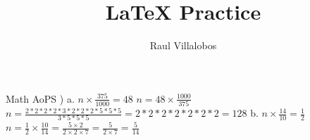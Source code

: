 \documentclass[11pt]{amsart}
\title{LaTeX Practice}
\author{Raul Villalobos}
\begin{document}
\maketitle

Math AoPS ) \newline
a. \newline
$
n\times\frac{375}{1000} = 48
$ \newline
$
n = 48 \times \frac{1000}{375}
$ \newline
$
n = \frac{2 * 2 * 2 * 2 * 3 * 2 * 2 * 2 * 5 * 5 * 5}
{3 * 5 * 5 * 5}
= 2 * 2 * 2 * 2 * 2 * 2 * 2
= 128
$ \newline \newline
b. \newline
$
n\times\frac{14}{10} = \frac{1}{2}
$ \newline
$
n = \frac{1}{2} \times \frac{10}{14}
= \frac{5 \times 2}{2 \times 2 \times 7}
= \frac{5}{2 \times 7}
= \frac{5}{14}
$ \newline
\end{document}

